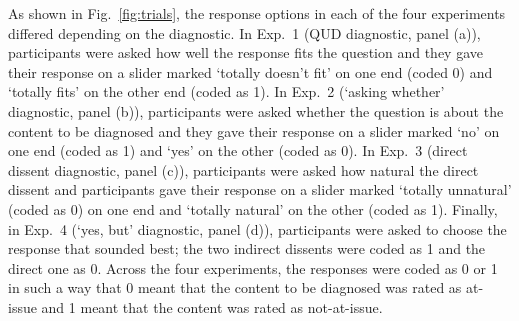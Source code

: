 \documentclass[times,linguex,xcolor]{glossa}
\begin{document}
As shown in Fig.~\ref{fig:trials}, the response options in each of the four experiments differed depending on the diagnostic. In Exp.~1 (QUD diagnostic, panel (a)), participants were asked how well the response fits the question and they gave their response on a slider marked `totally doesn't fit' on one end (coded 0) and `totally fits' on the other end (coded as 1). In Exp.~2 (`asking whether' diagnostic, panel (b)), participants were asked whether the question is about the content to be diagnosed and they gave their response on a slider marked `no' on one end (coded as 1) and `yes' on the other (coded as 0). In Exp.~3 (direct dissent diagnostic, panel (c)), participants were asked how natural the direct dissent and participants gave their response on a slider marked `totally unnatural' (coded as 0) on one end and `totally natural' on the other (coded as 1). Finally, in Exp.~4 (`yes, but' diagnostic, panel (d)), participants were asked to choose the response that sounded best; the two indirect dissents were coded as 1 and the direct one as 0. Across the four experiments, the responses were coded as 0 or 1 in such a way that 0 meant that the content to be diagnosed was rated as at-issue and 1 meant that the content was rated as not-at-issue.
\end{document}
